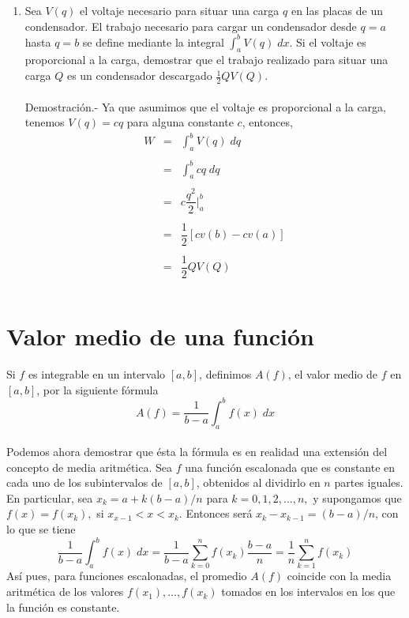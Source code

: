 \begin{enumerate}[ \bfseries 1.]
    \item Sea $V(q)$ el voltaje necesario para situar una carga $q$ en las placas de un condensador. El trabajo necesario para cargar un condensador desde $q=a$ hasta $q=b$ se define mediante la integral $\int_a^b V(q)\; dx$. Si el voltaje es proporcional a la carga, demostrar que el trabajo realizado para situar una carga $Q$ es un condensador descargado $\frac{1}{2}QV(Q)$.\\\\
	Demostración.-\; Ya que asumimos que el voltaje es proporcional a la carga, tenemos $V(q)=cq$ para alguna constante $c$, entonces,
	$$\begin{array}{rcl}
	    W&=&\displaystyle\int_a^b V(q)\; dq\\\\
	    &=&\displaystyle\int_a^b cq\; dq\\\\
	    &=&c\dfrac{q^2}{2}\bigg|_a^b\\\\
	    &=&\dfrac{1}{2}\left[cv(b)-cv(a)\right]\\\\
	    &=&\dfrac{1}{2}QV(Q)\\\\
	\end{array}$$
    
\end{enumerate}


\section{Valor medio de una función}

    \begin{def.}
	Si $f$ es integrable en un intervalo $[a,b]$, definimos $A(f)$, el valor medio de $f$ en $[a,b]$, por la siguiente fórmula
	$$A(f) = \dfrac{1}{b-a} \int_a^b f(x) \; dx$$\\
    Podemos ahora demostrar que ésta la fórmula es en realidad una extensión del concepto de media aritmética. Sea $f$ una función escalonada que es constante en cada uno de los subintervalos de $[a,b]$, obtenidos al dividirlo en $n$ partes iguales. En particular, sea $x_k=a+k(b-a)/n$ para $k=0,1,2,\ldots,n,$ y supongamos que $f(x)=f(x_k),$ si $x_{x-1}<x<x_k$. Entonces será $x_k - x_{k-1} = (b-a)/n$, con lo que se tiene
    $$\dfrac{1}{b-a}\int_a^b f(x)\; dx = \dfrac{1}{b-a}\sum_{k=0}^n f(x_k) \dfrac{b-a}{n} = \dfrac{1}{n} \sum_{k=1}^n f(x_k)$$
    Así pues, para funciones escalonadas, el promedio $A(f)$ coincide con la media aritmética de los valores $f(x_1),\ldots , f(x_k)$ tomados en los intervalos en los que la función es constante.
    
    \end{def.}

